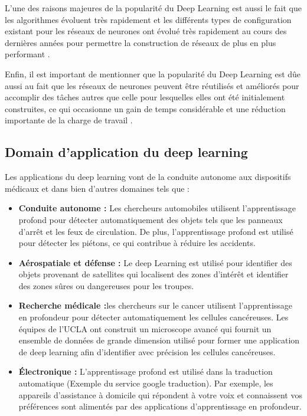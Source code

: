     \par L'une des raisons majeures de la popularité du Deep Learning est aussi le fait que les algorithmes évoluent très rapidement et les différents types de configuration existant pour les réseaux de neurones ont évolué très rapidement au cours des dernières années pour permettre la construction de réseaux de plus en plus performant \cite{ch2ref12,ch2ref1,ch2ref2}. 
    
    \par Enfin, il est important de mentionner que la popularité du Deep Learning est dûe aussi au fait que les réseaux de neurones peuvent être réutilisés et améliorés pour accomplir des tâches autres que celle pour lesquelles elles ont été initialement construites, ce qui occasionne un gain de temps considérable et une réduction importante de la charge de travail \cite{ch2ref12,ch2ref1,ch2ref2}.
    
    \subsection{Domain d'application du deep learning }
    \par Les applications du deep learning vont de la conduite autonome aux dispositifs médicaux et dans bien d'autres domaines tels que : \cite{ch2ref14} 
    
    \begin{itemize}[label=-] 
    \setlength{\itemsep}{5pt}
        \item \textbf{Conduite autonome : }Les chercheurs automobiles utilisent l’apprentissage profond pour détecter automatiquement des objets tels que les panneaux d’arrêt et les feux de circulation. De plus, l’apprentissage profond est utilisé pour détecter les piétons, ce qui contribue à réduire les accidents.
        
        \item \textbf{Aérospatiale et défense : }Le deep Learning est utilisé pour identifier des objets provenant de satellites qui localisent des zones d’intérêt et identifier des zones sûres ou dangereuses pour les troupes.
        
        \item \textbf{ Recherche médicale :}les chercheurs sur le cancer utilisent l’apprentissage en profondeur pour détecter automatiquement les cellules cancéreuses. Les équipes de l’UCLA ont construit un microscope avancé qui fournit un ensemble de données de grande dimension utilisé pour former une application de deep learning afin d’identifier avec précision les cellules cancéreuses.
        
        \item \textbf{Électronique : } L’apprentissage profond est utilisé dans la traduction automatique (Exemple du service google traduction). Par exemple, les appareils d’assistance à domicile qui répondent à votre voix et connaissent vos préférences sont alimentés par des applications d’apprentissage en profondeur.
    \end{itemize}
    
